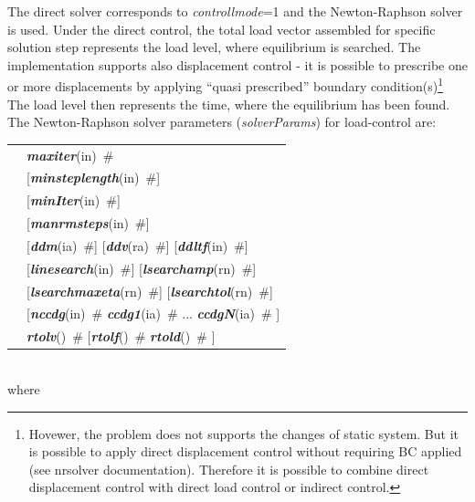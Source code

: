 \documentclass[a4paper]{article}
\makeatletter
\newcommand{\param}[1]{{\em #1}}
\newcommand{\keywordnotype}[1]{\mbox{{\it{\bf{#1}}}}}
\newcommand{\keyword}[2]{\mbox{{\keywordnotype{#1}\tiny (#2)}}}
\newcommand{\field}[2]{\mbox{\keyword{#1}{#2}~\#}}
\newcommand{\optField}[2]{\mbox{[\field{#1}{#2}]}}
\newenvironment{record}[1][]{\begin{tabular}{|ll}}{\end{tabular}\\}
\newcommand{\recentry}[2]{{#1}&{#2}\\}
\newcounter{rcc}
\newenvironment{record}[1][\textwidth]{\setcounter{rcc}{0}\begin{tabular*}{#1}{|ll@{\extracolsep{\fill}}r}}{\end{tabular*}\\}
\newcommand{\recentry}[2]{\ifthenelse{\value{rcc}>0}{&$\backslash$ \\}{\setcounter{rcc}{1}}{#1}&{#2}}
\makeatother
\begin{document}
The direct solver corresponds to \param{controllmode}=1 and the Newton-Raphson solver is used.
Under the direct control, the total load
vector assembled for specific solution step represents the load level,
where equilibrium is searched. The implementation supports also
displacement control -  it is possible to prescribe one or more
displacements by applying ``quasi prescribed'' boundary
condition(s)\footnote{Hovewer, the problem does not supports the
changes of static system. But it is possible to apply direct
displacement control without requiring BC applied (see nrsolver
documentation). Therefore it is possible to combine
direct displacement control with direct load control or indirect
control.}
The load level then represents the
time, where the equilibrium has been found. The Newton-Raphson solver parameters (\param{solverParams}) for
load-control are:\\
\begin{record}
\recentry{\hspace{10mm}}{\field{maxiter}{in}}
\recentry{}{\optField{minsteplength}{in}}
\recentry{}{\optField{minIter}{in}}
\recentry{}{\optField{manrmsteps}{in}}
\recentry{}{\optField{ddm}{ia} \optField{ddv}{ra} \optField{ddltf}{in}}
\recentry{}{\optField{linesearch}{in} \optField{lsearchamp}{rn}}
\recentry{}{\optField{lsearchmaxeta}{rn} \optField{lsearchtol}{rn}}
\recentry{}{[\field{nccdg}{in} \field{ccdg1}{ia} ... \field{ccdgN}{ia}  ]}
\recentry{}{\field{rtolv}{} [\field{rtolf}{} \field{rtold}{} ]}
\end{record}
where
\end{document}

